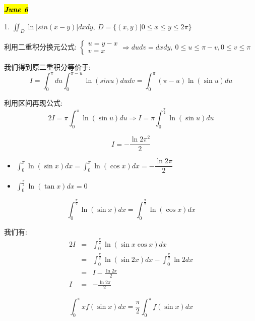 
\hl{\textbf{\textit{June 6}}}

1. $\iint_{D}\ln|sin(x-y)|dxdy,\ D=\{(x,y)|0\leq x\leq y\leq 2\pi\}$
\begin{solution}
	
	利用二重积分换元公式: $\left\lbrace 
	\begin{array}{l}
		u=y-x\\
		v=x
	\end{array}
	\right.\Rightarrow dudv=dxdy,\ 0\leq u\leq \pi-v,0\leq v\leq \pi$
	
	我们得到原二重积分等价于: 
	$$I=\int_{0}^{\pi}du\int_{0}^{\pi-u}\ln(sin u)dudv=\int_{0}^{\pi}(\pi-u)\ln(\sin u)du$$
	
	利用区间再现公式: 
	$$2I=\pi\int_{0}^{\pi}\ln(\sin u)du\Rightarrow I=\pi\int_{0}^{\frac{\pi}{2}}\ln(\sin u)du$$
	
	$$I=-\frac{\ln 2\pi^2}{2}$$
	\begin{lemma}[区间再现例子]
		\begin{itemize}
			\item $\int_{0}^{\pi}\ln(\sin x)dx=\int_{0}^{\pi}\ln(\cos x)dx=-\dfrac{\ln 2\pi}{2}$
			\item $\int_{0}^{\frac{\pi}{2}}\ln(\tan x)dx=0$
		\end{itemize}
		\begin{anymark}[注]
			$$\int_{0}^{\frac{\pi}{2}}\ln(\sin x)dx=\int_{0}^{\frac{\pi}{2}}\ln(\cos x)dx$$
			
			我们有: 
			\begin{eqnarray*}
				2I&=&\int_{0}^{\frac{\pi}{2}}\ln(\sin x\cos x)dx\\
				&=&\int_{0}^{\frac{\pi}{2}}\ln(\sin 2x)dx-\int_{0}^{\frac{\pi}{2}}\ln 2dx\\
				&=&I-\frac{\ln 2\pi}{2}\\
				I&=&-\frac{\ln 2\pi}{2}
			\end{eqnarray*}
		\end{anymark}
		$$\int_{0}^{\pi}xf(\sin x)dx=\frac{\pi}{2}\int_{0}^{\pi}f(\sin x)dx$$
	\end{lemma}
\end{solution}


